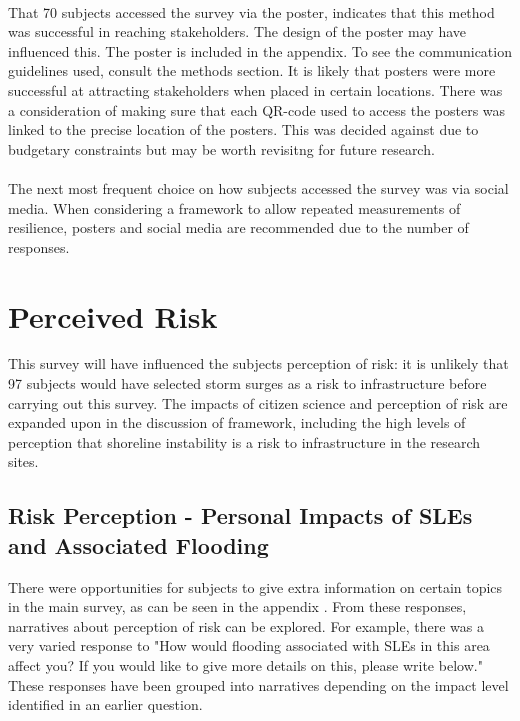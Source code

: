 \paragraph{}
That 70 subjects accessed the survey via the poster, indicates that this method was successful in reaching stakeholders. The design of the poster may have influenced this. The poster is included in the appendix. To see the communication guidelines used, consult the methods section. It is likely that posters were more successful at attracting stakeholders when placed in certain locations. There was a consideration of making sure that each QR-code used to access the posters was linked to the precise location of the posters. This was decided against due to budgetary constraints but may be worth revisitng for future research.

\paragraph{}
The next most frequent choice on how subjects accessed the survey was via social media. When considering a framework to allow repeated measurements of resilience, posters and social media are recommended due to the number of responses. 
\paragraph{}

\section{Perceived Risk}
This survey will have influenced the subjects perception of risk: it is unlikely that 97 subjects would have selected storm surges as a risk to infrastructure before carrying out this survey. The impacts of citizen science and perception of risk are expanded upon in the discussion of framework, including the high levels of perception that shoreline instability is a risk to infrastructure in the research sites.

\subsection{Risk Perception - Personal Impacts of SLEs and Associated Flooding}
There were opportunities for subjects to give extra information on certain topics in the main survey, as can be seen in the appendix . From these responses, narratives about perception of risk can be explored. For example, there was a very varied response to "How would flooding associated with SLEs in this area affect you? If you would like to give more details on this, please write below." These responses have been grouped into narratives depending on the impact level identified in an earlier question. 
